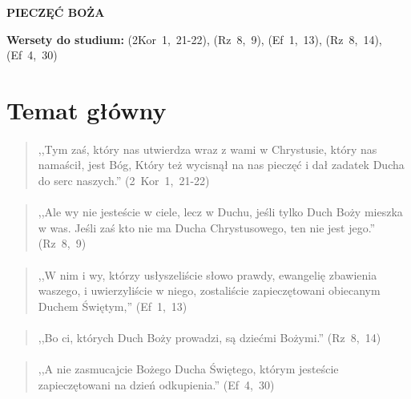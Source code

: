 \documentclass[10pt,a4paper,oneside]{article}
\begin{document}
\centerline{\textbf{\MakeUppercase{Pieczęć Boża}}}
\begin{center}
\textbf{Wersety do studium:} \mbox{(2Kor 1, 21-22)}, \mbox{(Rz 8, 9)}, \mbox{(Ef 1, 13)}, \mbox{(Rz 8, 14)}, \mbox{(Ef 4, 30)}
\end{center}
\section{Temat główny}
\paragraph{}
\begin{quote}
,,Tym zaś, który nas utwierdza wraz z wami w Chrystusie, który nas namaścił, jest Bóg, Który też wycisnął na nas pieczęć i dał zadatek Ducha do serc naszych.'' \mbox{(2 Kor 1, 21-22)}
\end{quote}
\paragraph{}
\begin{quote}
,,Ale wy nie jesteście w ciele, lecz w Duchu, jeśli tylko Duch Boży mieszka w was. Jeśli zaś kto nie ma Ducha Chrystusowego, ten nie jest jego.'' \mbox{(Rz 8, 9)}
\end{quote}
\paragraph{}
\begin{quote}
,,W nim i wy, którzy usłyszeliście słowo prawdy, ewangelię zbawienia waszego, i uwierzyliście w niego, zostaliście zapieczętowani obiecanym Duchem Świętym,'' \mbox{(Ef 1, 13)}
\end{quote}
\paragraph{}
\begin{quote}
,,Bo ci, których Duch Boży prowadzi, są dziećmi Bożymi.'' \mbox{(Rz 8, 14)}
\end{quote}
\paragraph{}
\begin{quote}
,,A nie zasmucajcie Bożego Ducha Świętego, którym jesteście zapieczętowani na dzień odkupienia.'' \mbox{(Ef 4, 30)}
\end{quote}
\end{document}
